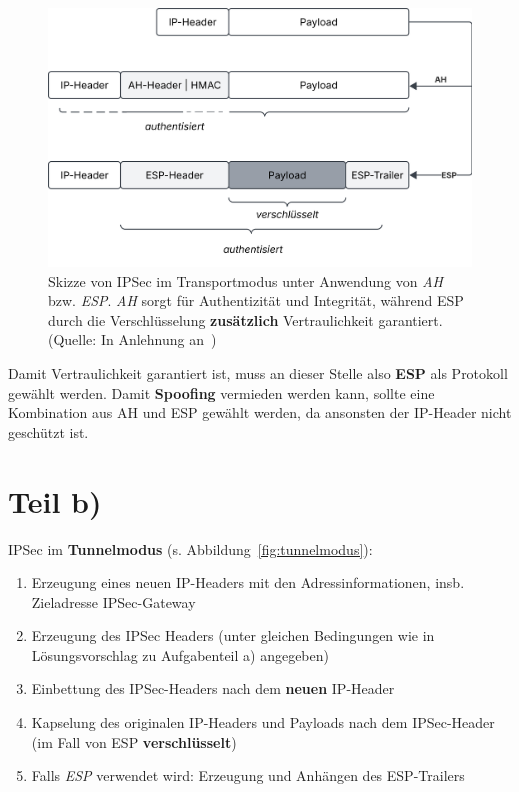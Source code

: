 \begin{figure}
    \centering
    \includegraphics[scale=0.4]{aufgabe 3/img/transportmodus.svg}
    \caption{Skizze von IPSec im Transportmodus unter Anwendung von \textit{AH} bzw. \textit{ESP}. \textit{AH} sorgt für Authentizität und Integrität, während ESP durch die Verschlüsselung \textbf{zusätzlich} Vertraulichkeit garantiert. (Quelle: In Anlehnung an~\cite[\textbf{Abb. 3.6}, 41]{ITS4})}
    \label{fig:transportmodus}
\end{figure}

\noindent
Damit Vertraulichkeit garantiert ist, muss an dieser Stelle also \textbf{ESP} als Protokoll gewählt werden.
Damit \textbf{Spoofing} vermieden werden kann, sollte eine Kombination aus AH und ESP gewählt werden, da ansonsten der IP-Header nicht geschützt ist.

\section{Teil b)}
IPSec im \textbf{Tunnelmodus} (s. Abbildung~\ref{fig:tunnelmodus}):

\begin{enumerate}
    \itemsep0.5em
    \item Erzeugung eines neuen IP-Headers mit den Adressinformationen, insb. Zieladresse IPSec-Gateway
    \item Erzeugung des IPSec Headers (unter gleichen Bedingungen wie in Lösungsvorschlag zu Aufgabenteil a) angegeben)
    \item Einbettung des IPSec-Headers nach dem \textbf{neuen} IP-Header
    \item Kapselung des originalen IP-Headers und Payloads nach dem IPSec-Header (im Fall von ESP \textbf{verschlüsselt})
    \item Falls \textit{ESP} verwendet wird: Erzeugung und Anhängen des ESP-Trailers
\end{enumerate}

